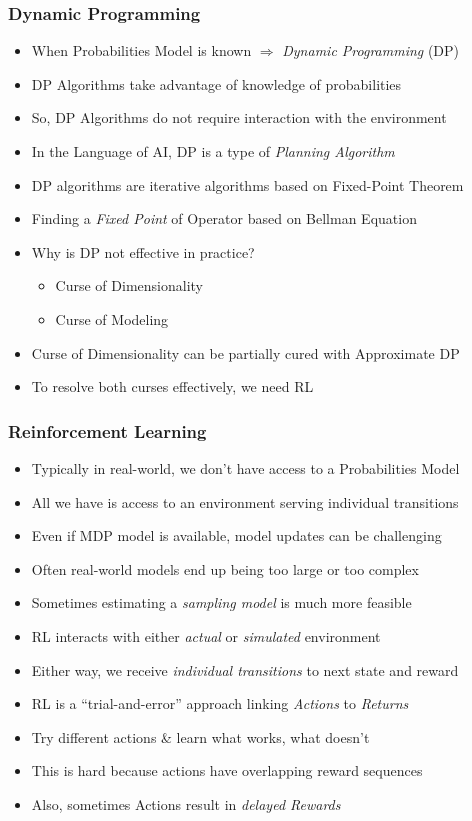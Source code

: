 \documentclass[handout]{beamer}
\begin{document}
\begin{frame}
\frametitle{Dynamic Programming}
\pause
\begin{itemize}[<+->]
\item When Probabilities Model is known $\Rightarrow$ {\em Dynamic Programming} (DP)
\item DP Algorithms take advantage of knowledge of probabilities
\item So, DP Algorithms do not require interaction with the environment
\item In the Language of AI, DP is a type of {\em Planning Algorithm}
\item DP algorithms are iterative algorithms based on Fixed-Point Theorem
\item Finding a {\em Fixed Point} of Operator based on Bellman Equation
\item Why is DP not effective in practice?
\pause
\begin{itemize}[<+->]
\item Curse of Dimensionality
\item Curse of Modeling
\end{itemize}
\item Curse of Dimensionality can be partially cured with Approximate DP
\item To resolve both curses effectively, we need RL
\end{itemize}
\end{frame}

\begin{frame}
\frametitle{Reinforcement Learning}
\pause
\begin{itemize}[<+->]
\item Typically in real-world, we don't have access to a Probabilities Model
\item All we have is access to an environment serving individual transitions
\item Even if MDP model is available, model updates can be challenging
\item Often real-world models end up being too large or too complex
\item Sometimes estimating a {\em sampling model} is much more feasible
\item RL interacts with either {\em actual} or {\em simulated} environment
\item Either way, we receive {\em individual transitions} to next state and reward
\item RL is a ``trial-and-error'' approach linking {\em Actions} to {\em Returns}
\item Try different actions \& learn what works, what doesn't
\item This is hard because actions have overlapping reward sequences
\item Also, sometimes Actions result in {\em delayed Rewards}
\end{itemize}
\end{frame}
\end{document}
